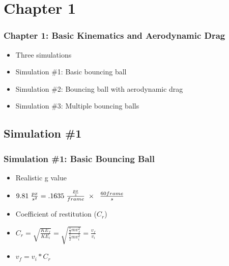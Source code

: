 \documentclass{beamer}
\begin{document}
\section{Chapter 1}



\begin{frame}
\frametitle{Chapter 1: Basic Kinematics and Aerodynamic Drag}

\begin{itemize}
\item Three simulations
\item Simulation \#1: Basic bouncing ball
\item Simulation \#2: Bouncing ball with aerodynamic drag
\item Simulation \#3: Multiple bouncing balls

\end{itemize}
\end{frame}









\subsection{Simulation \#1}
\begin{frame}
\frametitle{Simulation \#1: Basic Bouncing Ball}

\begin{itemize}

\item Realistic g value

\item $
9.81 \hspace{1mm}  \frac{px}{s^2}  = .1635 \hspace{1mm}  \frac{\frac{px}{s}}{frame} \hspace{1mm}  \times \hspace{1mm}  \hspace{1mm}  \frac{60 frame}{s}
$

\vspace{1cm}
\item Coefficient of restitution ($C_r$)

\item $
C_r = \sqrt{\frac{KE_f}{KE_i}} = \sqrt{\frac{\frac{1}{2} mv_f^2}{\frac{1}{2} mv_i^2}} = \frac{v_f}{v_i}
$

\item $
v_f = v_i * C_r
$


\end{itemize}



\end{frame}
\end{document}
